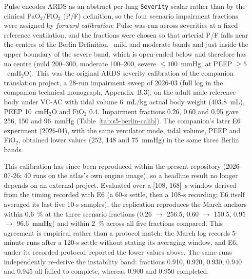 \documentclass[pdflatex,sn-nature]{sn-jnl}%
\begin{document}
Pulse encodes ARDS as an abstract per-lung \texttt{Severity} scalar rather than by the clinical PaO$_2$/FiO$_2$ (P/F) definition, so the four scenario impairment fractions were assigned by \emph{forward calibration}: Pulse was run across severities at a fixed reference ventilation, and the fractions were chosen so that arterial P/F falls near the centres of the Berlin Definition~\cite{ards2012} mild and moderate bands and just inside the upper boundary of the severe band, which is open-ended below and therefore has no centre (mild 200--300, moderate 100--200, severe $\leq 100$~mmHg, at PEEP $\geq 5$~cmH$_2$O). This was the original ARDS severity calibration of the companion translation project, a 28-run impairment sweep of 2026-03 (full log in the companion technical monograph, Appendix~B.3), on the adult male reference body under VC-AC with tidal volume 6~mL/kg actual body weight (403.8~mL), PEEP 10~cmH$_2$O and FiO$_2$ 0.4. Impairment fractions 0.26, 0.60 and 0.95 gave 256, 150 and 96~mmHg (Table~\ref{tab:s5-berlin-calib}). The companion's later E6 experiment (2026-04), with the same ventilator mode, tidal volume, PEEP and FiO$_2$, obtained lower values (252, 148 and 75~mmHg) in the same three Berlin bands.

This calibration has since been reproduced within the present repository (2026-07-26; 40 runs on the atlas's own engine image), so a headline result no longer depends on an external project. Evaluated over a [108, 168]~s window derived from the timing recorded with E6 (a 60-s settle, then a 108-s recording; E6 itself averaged its last five 10-s samples), the replication reproduces the March anchors within 0.6~\% at the three scenario fractions (0.26 $\to$ 256.5, 0.60 $\to$ 150.5, 0.95 $\to$ 96.6~mmHg) and within 2~\% across all five fractions compared. This agreement is empirical rather than a protocol match: the March log records 5-minute runs after a 120-s settle without stating its averaging window, and E6, under its recorded protocol, reported the lower values above. The same runs independently re-derive the instability band: fractions 0.910, 0.920, 0.930, 0.940 and 0.945 all failed to complete, whereas 0.900 and 0.950 completed.
\end{document}
